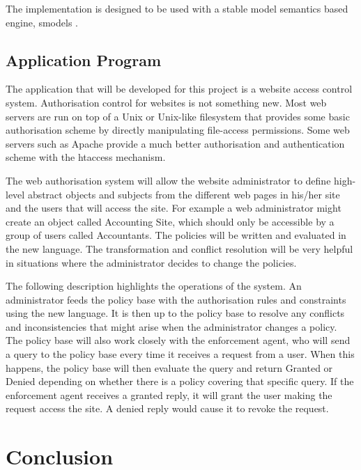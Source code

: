 \documentclass[a4paper]{article}
\begin{document}
        The implementation is designed to be used with a stable model
        semantics based engine, smodels \cite{S}.

    \subsection{Application Program}

      The application that will be developed for this project is a website 
      access control system. Authorisation control for websites is not 
      something new. Most web servers are run on top of a Unix or Unix-like
      filesystem that provides some basic authorisation scheme by directly
      manipulating file-access permissions. Some web servers such as Apache
      provide a much better authorisation and authentication scheme with
      the htaccess mechanism.

      The web authorisation system will allow the website administrator to
      define high-level abstract objects and subjects from the different web
      pages in his/her site and the users that will access the site. For
      example a web administrator might create an object called Accounting
      Site, which should only be accessible by a group of users called
      Accountants. The policies will be written and evaluated in the new
      language. The transformation and conflict resolution will be very
      helpful in situations where the administrator decides to change
      the policies.

      The following description highlights the operations of the system. 
      An administrator feeds the policy base with the authorisation rules
      and constraints using the new language. It is then up to the policy
      base to resolve any conflicts and inconsistencies that might arise
      when the administrator changes a policy. The policy base will also
      work closely with the enforcement agent, who will send a query to
      the policy base every time it receives a request from a user. When
      this happens, the policy base will then evaluate the query and return
      Granted or Denied depending on whether there is a policy covering
      that specific query. If the enforcement agent receives a granted 
      reply, it will grant the user making the request access the site.
      A denied reply would cause it to revoke the request.

  \section{Conclusion}
\end{document}
